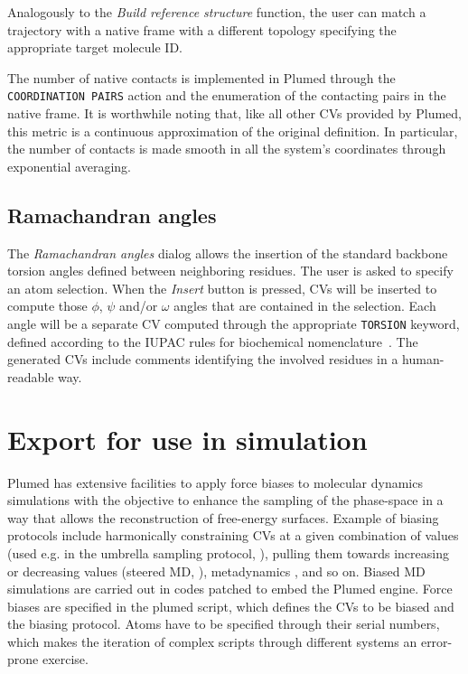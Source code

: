\documentclass[preprint,12pt]{elsarticle}
\begin{document}
Analogously to the \emph{Build reference structure} function, the user
can match a trajectory with a native frame with a different topology
specifying the appropriate target molecule ID.

The number of native contacts is implemented in Plumed through the
\texttt{COORDINATION PAIRS} action and the enumeration of the
contacting pairs in the native frame.  It is worthwhile noting that,
like all other CVs provided by Plumed, this metric is a continuous
approximation of the original definition. In particular, the number of
contacts is made smooth in all the system's coordinates through
exponential averaging.




\subsection{Ramachandran angles}

The \emph{Ramachandran angles} dialog allows the insertion of the
standard backbone torsion angles defined between neighboring residues.
The user is asked to specify an atom selection. When the \emph{Insert}
button is pressed, CVs will be inserted to compute those $\phi$,
$\psi$ and/or $\omega$ angles that are contained in the
selection. Each angle will be a separate CV computed through the
appropriate \texttt{TORSION} keyword, defined according to the IUPAC
rules for biochemical nomenclature~\cite{IUPAC}. The generated CVs
include comments identifying the involved residues in a human-readable
way.








\section{Export for use in simulation}\label{sec:export-use-simul}

Plumed has extensive facilities to apply force biases to molecular
dynamics simulations with the objective to enhance the sampling of the
phase-space in a way that allows the reconstruction of free-energy
surfaces. Example of biasing protocols include harmonically
constraining CVs at a given combination of values (used e.g. in the
umbrella sampling protocol, \cite{Torrie_Valleau_1977}), pulling them
towards increasing or decreasing values (steered MD,
\cite{Isralewitz_Gao_Schulten_2001,Giorgino_2011}), metadynamics
\cite{Laio_Parrinello_2002}, and so on. Biased MD simulations are
carried out in codes patched to embed the Plumed engine. Force biases
are specified in the plumed script, which defines the CVs to be biased
and the biasing protocol.  Atoms have to be specified through their
serial numbers, which makes the iteration of complex scripts through
different systems an error-prone exercise.
\end{document}
